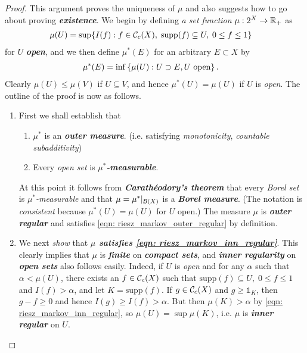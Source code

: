 \documentclass[11pt]{article}
\begin{document}
\begin{itemize}
\begin{proof}
This argument proves the uniqueness of $\mu$ and also suggests how to go about proving \emph{\textbf{existence}}. We begin by defining \emph{a set function} $\mu: 2^{X} \rightarrow {\mathbb R}_{+}$ as
\begin{align*}
\mu(U) &= \sup\{I(f): f \in {\mathcal C}_c(X),\; \text{supp}(f) \subseteq U, \; 0 \le f \le 1\}
\end{align*}
for $U$ \emph{\textbf{open}}, and we then define $\mu^{*}(E)$ for an arbitrary $E \subset X$ by
\begin{align*}
\mu^{*}(E) &= \inf\left\{\mu(U): U \supset E, U\text{ open}\right\}.
\end{align*} Clearly $\mu(U) \le \mu(V)$ if $U \subseteq V$, and hence $\mu^{*}(U) = \mu(U)$ if $U$ is \emph{open}. 
The outline of the proof is now as follows. 
\begin{enumerate}
\item First we shall establish that
\begin{enumerate}
\item $\mu^{*}$ is an \emph{\textbf{outer measure}}. (i.e. satisfying \emph{monotonicity}, \emph{countable subadditivity})
\item Every \emph{open set} is \emph{\textbf{$\mu^{*}$-measurable}}.
\end{enumerate}
At this point it follows from \emph{\textbf{Carath\'eodory's theorem}} that every \emph{Borel set} is \emph{$\mu^{*}$-measurable} and that $\mu = \mu^{*}|_{{\mathcal B}(X)}$ is a \emph{\textbf{Borel measure}}. (The notation is \emph{consistent} because $\mu^{*}(U) = \mu(U)$ for $U$ open.) The measure $\mu$ is \emph{\textbf{outer regular}} and satisfies \eqref{eqn: riesz_markov_outer_regular} by definition. 

\item We next \emph{show} that \emph{\textbf{$\mu$ satisfies \eqref{eqn: riesz_markov_inn_regular}}}. This clearly implies that $\mu$ is \emph{\textbf{finite}} on \emph{\textbf{compact sets}}, and \emph{\textbf{inner regularity}} on \emph{\textbf{open sets}} also follows easily. 
Indeed, if $U$ is \emph{open} and for any $\alpha$ such that $\alpha < \mu(U)$, there exists an $f \in {\mathcal C}_c(X)$ such that $\text{supp}(f) \subseteq U, \; 0 \le f \le 1$ and $I(f) > \alpha$, and let $K = \text{supp}(f)$. If $g \in {\mathcal C}_c(X)$  and $g \ge \mathds{1}_{K}$, then
$g - f \ge 0$ and hence $I(g) \ge I(f) > \alpha$. But then $\mu(K) > \alpha$ by \eqref{eqn: riesz_markov_inn_regular}, so $\mu(U) = \sup \mu(K)$, i.e. $\mu$ is \emph{\textbf{inner regular}} on $U$. 


\end{enumerate}
\end{proof}
\end{itemize}
\end{document}
